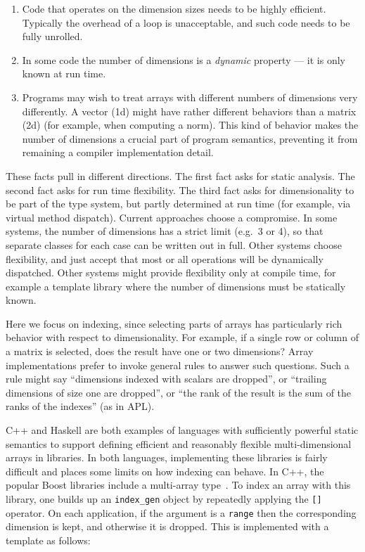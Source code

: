 \begin{enumerate}
\item Code that operates on the dimension sizes needs to be highly efficient.
Typically the overhead of a loop is unacceptable, and such code needs to be fully
unrolled.
\item In some code the number of dimensions is a \emph{dynamic} property --- it is
only known at run time.
\item Programs may wish to treat arrays with different numbers of dimensions very
differently.
A vector (1d) might have rather different behaviors than a matrix (2d)
(for example, when computing a norm).
This kind of behavior makes the number of dimensions a crucial part of program
semantics, preventing it from remaining a compiler implementation detail.
\end{enumerate}

These facts pull in different directions.
The first fact asks for static analysis.
The second fact asks for run time flexibility.
The third fact asks for dimensionality to be part of the type system, but
partly determined at run time (for example, via virtual method dispatch).
Current approaches choose a compromise.
In some systems, the number of dimensions has a strict limit (e.g.\ 3 or 4),
so that separate classes for each case can be written out in full.
Other systems choose flexibility, and just accept that most
or all operations will be dynamically dispatched.
Other systems might provide flexibility only at compile time, for example a
template library where the number of dimensions must be statically known.

Here we focus on indexing, since selecting parts of arrays has particularly
rich behavior with respect to dimensionality.
For example, if a single row or column of a matrix is
selected, does the result have one or two dimensions?
Array implementations prefer to invoke general rules to answer such questions.
Such a rule might say ``dimensions indexed with scalars are dropped'', or ``trailing
dimensions of size one are dropped'', or ``the rank of the result
is the sum of the ranks of the indexes'' (as in APL).

C++ and Haskell are both examples of languages with sufficiently powerful
static semantics to support defining efficient and reasonably flexible
multi-dimensional arrays in libraries.
In both languages, implementing these libraries is fairly difficult and
places some limits on how indexing can behave.
In C++, the popular Boost libraries include a multi-array
type~\cite{garcia2005multiarray}.
To index an array with this library, one builds up an \texttt{index\_gen}
object by repeatedly applying the \texttt{[]} operator.
On each application, if the argument is a \texttt{range} then the
corresponding dimension is kept, and otherwise it is dropped.
This is implemented with a template as follows:

